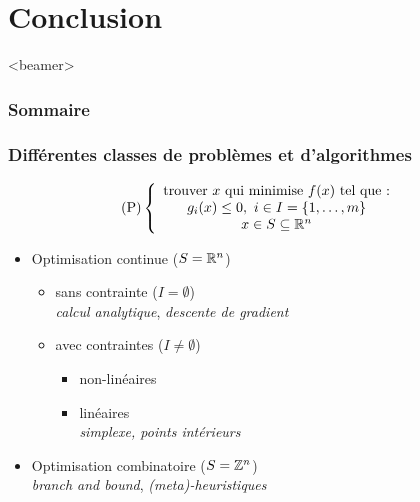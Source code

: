 \section{Conclusion}

\begin{frame}<beamer>
  \frametitle{Sommaire}
  \tableofcontents[currentsection]
\end{frame}

\begin{frame}
  \frametitle{Différentes classes de problèmes et d'algorithmes}

  \[
  \text{(P)} \left\{
  \begin{array}{c}
    \text{trouver} \ x \ \text{qui minimise} \ f(x) \ \text{tel que :} \\
    g_i(x) \leq 0, \ i \in I = \{1, \dots, m\} \\
    x \in S \subseteq {\ensuremath\mathbb{R}}^n
  \end{array}
  \right.
  \]

  \begin{itemize}
  \item Optimisation continue ($S = {\mathbb{R}}^n$)
    \begin{itemize}
    \item sans contrainte ($I = \emptyset$) \\
      \emph{calcul analytique}, \emph{descente de gradient}
    \item avec contraintes ($I \neq \emptyset$) 
      \begin{itemize}
        \item non-linéaires
        \item linéaires \\
        \emph{simplexe, points intérieurs}
      \end{itemize}
    \end{itemize}
  \item Optimisation combinatoire ($S = {\mathbb{Z}}^n$)\\
    \emph{branch and bound}, \emph{(meta)-heuristiques} 
  \end{itemize}
  
\end{frame}

